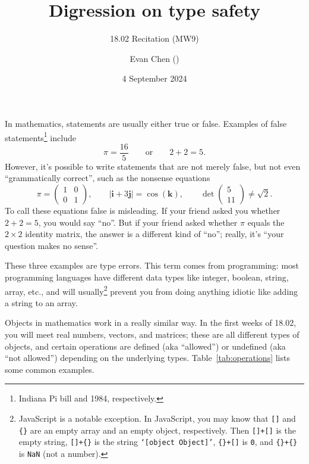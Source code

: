 \documentclass[11pt]{scrartcl}
\begin{document}
\title{Digression on type safety}
\subtitle{18.02 Recitation (MW9)}
\author{Evan Chen ()}
\date{4 September 2024}
\maketitle

In mathematics, statements are usually either true or false.
Examples of false statements\footnote{Indiana Pi bill and 1984, respectively.} include
\[ \pi = \frac{16}{5} \qquad \text{or}\qquad 2+2=5. \]
However, it's possible to write statements that are not merely false,
but not even ``grammatically correct'', such as the nonsense equations
\[ \pi = \begin{pmatrix} 1 & 0 \\ 0 & 1 \end{pmatrix},
  \qquad \left\lvert \mathbf i + 3 \mathbf j \right\rvert = \cos(\mathbf k), \qquad
\det \begin{pmatrix} 5 \\ 11 \end{pmatrix} \neq \sqrt{2}.  \]
To call these equations false is misleading.
If your friend asked you whether $2+2=5$, you would say ``no''.
But if your friend asked whether $\pi$ equals the $2 \times 2$ identity matrix,
the answer is a different kind of ``no''; really, it's ``your question makes no sense''.

These three examples are \alert{type errors}.
This term comes from programming: most programming languages have different data types
like integer, boolean, string, array, etc.,
and will usually\footnote{JavaScript is a notable exception.
  In JavaScript, you may know that \texttt{[]} and \texttt{\{\}}
  are an empty array and an empty object, respectively.
  Then \texttt{[]+[]} is the empty string,
  \texttt{[]+\{\}} is the string \texttt{`[object Object]'},
  \texttt{\{\}+[]} is \texttt{0},
  and \texttt{\{\}+\{\}} is \texttt{NaN} (not a number).}
prevent you from doing anything idiotic like adding a string to an array.

Objects in mathematics work in a really similar way.
In the first weeks of 18.02, you will meet real numbers, vectors, and matrices;
these are all different types of objects, and certain operations are
\alert{defined} (aka ``allowed'') or \alert{undefined} (aka ``not allowed'')
depending on the underlying types.
Table~\ref{tab:operations} lists some common examples.
\end{document}
